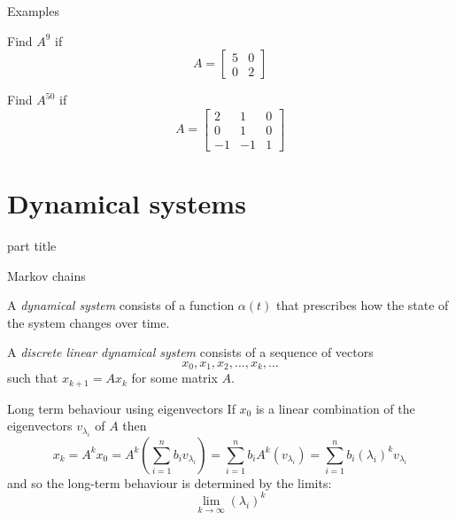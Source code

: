 \documentclass{beamer}
\begin{document}
\begin{frame}{Examples}
\begin{example}
	Find $A^9$ if
	\begin{equation*}
	A = \left[
	\begin{matrix}
	5&0\\
	0&2
	\end{matrix}
	\right]
	\end{equation*}
\end{example}
\begin{example}
	Find $A^{50}$ if 
	\begin{equation*}
	A = \left[
	\begin{matrix}
	2&1&0\\
	0&1&0\\
	-1&-1&1
	\end{matrix}
	\right]
	\end{equation*}
\end{example}
\end{frame}

\section{Dynamical systems}

\begin{frame}
\begin{beamercolorbox}[sep=12pt,center]{part title}
\insertsection\par
\end{beamercolorbox}
\end{frame}

\begin{frame}{Markov chains}
\begin{definition}
	A \emph{dynamical system} consists of a function $\alpha(t)$ that prescribes how the state of the system changes over time. 
\end{definition}
\begin{definition}
	A \emph{discrete linear dynamical system} consists of a sequence of vectors
	\begin{equation*}
	x_0, x_1, x_2, \dots, x_k, \dots
	\end{equation*}
	such that $x_{k+1} = Ax_{k}$ for some matrix $A$.
\end{definition}
\end{frame}

\begin{frame}{Long term behaviour using eigenvectors}
If $x_0$ is a linear combination of the eigenvectors $v_{\lambda_i}$ of $A$ then 
\begin{equation*}
x_k = A^k x_0 = A^k\left(\sum_{i=1}^n b_i v_{\lambda_i}\right) = \sum_{i=1}^n b_i A^k\left(v_{\lambda_i}\right) = \sum_{i=1}^nb_i(\lambda_i)^kv_{\lambda_i}
\end{equation*}
and so the long-term behaviour is determined by the limits:
\begin{equation*}
\lim_{k\to \infty} (\lambda_i)^k
\end{equation*}
\end{frame}
\end{document}
